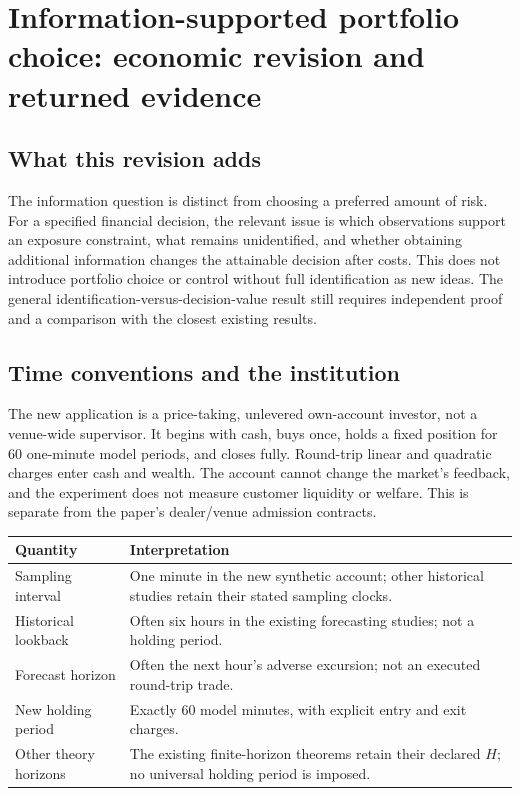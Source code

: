 \section*{Information-supported portfolio choice: economic revision and returned evidence}

\subsection*{What this revision adds}
The information question is distinct from choosing a preferred amount of risk.
For a specified financial decision, the relevant issue is which observations
support an exposure constraint, what remains unidentified, and whether obtaining
additional information changes the attainable decision after costs. This does
not introduce portfolio choice or control without full identification as new
ideas. The general identification-versus-decision-value result still requires
independent proof and a comparison with the closest existing results.

\subsection*{Time conventions and the institution}
The new application is a price-taking, unlevered own-account investor, not a
venue-wide supervisor. It begins with cash, buys once, holds a fixed position
for 60 one-minute model periods, and closes fully. Round-trip linear and
quadratic charges enter cash and wealth. The account cannot change the market's
feedback, and the experiment does not measure customer liquidity or welfare.
This is separate from the paper's dealer/venue admission contracts.

\begin{center}\small
\begin{tabular}{p{}p{}}
\toprule
Quantity & Interpretation\\
\midrule
Sampling interval & One minute in the new synthetic account; other historical studies retain their stated sampling clocks.\\
Historical lookback & Often six hours in the existing forecasting studies; not a holding period.\\
Forecast horizon & Often the next hour's adverse excursion; not an executed round-trip trade.\\
New holding period & Exactly 60 model minutes, with explicit entry and exit charges.\\
Other theory horizons & The existing finite-horizon theorems retain their declared $H$; no universal holding period is imposed.\\
\bottomrule
\end{tabular}
\end{center}

